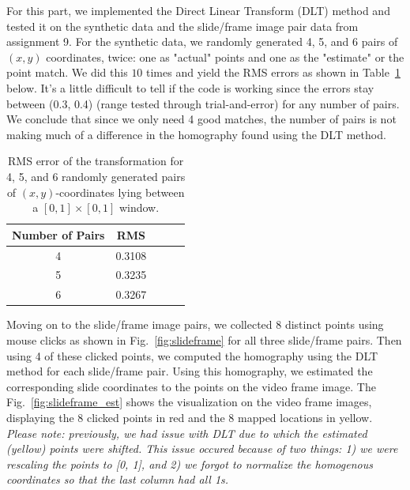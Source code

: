For this part, we implemented the Direct Linear Transform (DLT) method and tested it on the synthetic data and the slide/frame image pair data from assignment 9. For the synthetic data, we randomly generated 4, 5, and 6 pairs of $(x, y)$ coordinates, twice: one as "actual" points and one as the "estimate" or the point match. We did this $10$ times and yield the RMS errors as shown in Table~\ref{table:rms} below. It's a little difficult to tell if the code is working since the errors stay between (0.3, 0.4) (range tested through trial-and-error) for any number of pairs. We conclude that since we only need 4 good matches, the number of pairs is not making much of a difference in the homography found using the DLT method.

\begin{table}[h]
\begin{center}
\begin{tabular}{|c|c|c|c|c|}
\hline
Number of Pairs & RMS  \\
\hline
4 & 0.3108 \\
\hline
5 & 0.3235 \\
\hline
6 & 0.3267 \\ 
\hline
\end{tabular}
\end{center}
\caption{ RMS error of the transformation for 4, 5, and 6 randomly generated pairs of $(x, y)$-coordinates lying between a $[0,1]\times[0,1]$ window.}
\label{table:rms}
\end{table}

Moving on to the slide/frame image pairs, we collected 8 distinct points using mouse clicks as shown in Fig.~\ref{fig:slideframe} for all three slide/frame pairs. Then using 4 of these clicked points, we computed the homography using the DLT method for each slide/frame pair. Using this homography, we estimated the corresponding slide coordinates to the points on the video frame image. The Fig.~\ref{fig:slideframe_est} shows the visualization on the video frame images, displaying the 8 clicked points in red and the 8 mapped locations in yellow. {\it Please note: previously, we had issue with DLT due to which the estimated (yellow) points were shifted. This issue occured because of two things: 1) we were rescaling the points to [0, 1], and 2) we forgot to normalize the homogenous coordinates so that the last column had all 1s.}

